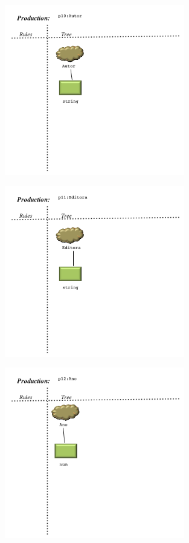 \begin{figure}[!htb]
  \centering
    \includegraphics[width=0.7\textwidth]{./imagens/VisualLisa/__p10_Autor.png}
\end{figure}
\begin{figure}[!htb]
  \centering
    \includegraphics[width=0.7\textwidth]{./imagens/VisualLisa/__p11_Editora.png}
\end{figure}
\begin{figure}[!htb]
  \centering
    \includegraphics[width=0.7\textwidth]{./imagens/VisualLisa/__p12_Ano.png}
\end{figure}
